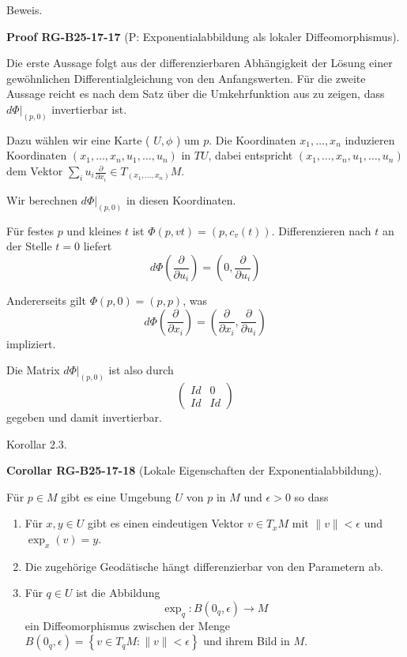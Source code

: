 \documentclass[10pt, letterpaper]{article}
\newcommand{\CustomHeading}[3]{%
  \par\medskip\noindent%
  \textbf{#1 #2} \textnormal{(#3)}.\enskip%
}
\newenvironment{KORO}[2]{\begin{unitbox}\CustomHeading{Corollar}{#1}{#2}}{\end{unitbox}}
\newenvironment{PROOF}[2]{\begin{unitbox}\CustomHeading{Proof}{#1}{#2}}{\end{unitbox}}
\begin{document}
Beweis. 

\begin{PROOF}{RG-B25-17-17}{P: Exponentialabbildung als lokaler Diffeomorphismus}
Die erste Aussage folgt aus der differenzierbaren Abhängigkeit der Lösung einer gewöhnlichen Differentialgleichung von den Anfangswerten. Für die zweite Aussage reicht es nach dem Satz über die Umkehrfunktion aus zu zeigen, dass $\left.d \Phi\right|_{(p, 0)}$ invertierbar ist.

Dazu wählen wir eine Karte ( $U, \phi$ ) um $p$. Die Koordinaten $x_{1}, \ldots, x_{n}$ induzieren Koordinaten $\left(x_{1}, \ldots, x_{n}, u_{1}, \ldots, u_{n}\right)$ in $T U$, dabei entspricht $\left(x_{1}, \ldots, x_{n}, u_{1}, \ldots, u_{n}\right)$ dem Vektor $\sum_{i} u_{i} \frac{\partial}{\partial x_{i}} \in T_{\left(x_{1}, \ldots, x_{n}\right)} M$.

Wir berechnen $\left.d \Phi\right|_{(p, 0)}$ in diesen Koordinaten.

Für festes $p$ und kleines $t$ ist $\Phi(p, v t)=\left(p, c_{v}(t)\right)$. Differenzieren nach $t$ an der Stelle $t=0$ liefert 
$$d \Phi\left(\frac{\partial}{\partial u_{i}}\right)=\left(0, \frac{\partial}{\partial u_{i}}\right)$$

Andererseits gilt $\Phi(p, 0)=(p, p)$, was 
$$d \Phi\left(\frac{\partial}{\partial x_{i}}\right)=\left(\frac{\partial}{\partial x_{i}}, \frac{\partial}{\partial u_{i}}\right)$$ 
impliziert.

Die Matrix $\left.d \Phi\right|_{(p, 0)}$ ist also durch 
$$\left(\begin{array}{cc}I d & 0 \\ I d & I d\end{array}\right)$$ 
gegeben und damit invertierbar.
\end{PROOF}




Korollar 2.3. 

\begin{KORO}{RG-B25-17-18}{Lokale Eigenschaften der Exponentialabbildung}
Für $p \in M$ gibt es eine Umgebung $U$ von $p$ in $M$ und $\epsilon>0$ so dass
\begin{enumerate}
  \item Für $x, y \in U$ gibt es einen eindeutigen Vektor $v \in T_{x} M$ mit $\|v\| < \epsilon$ und $\exp_{x}(v) = y$.
  
  \item Die zugehörige Geodätische hängt differenzierbar von den Parametern ab.

  \item Für $q \in U$ ist die Abbildung
  \[
  \exp_{q} : B\left(0_{q}, \epsilon\right) \rightarrow M
  \]
  ein Diffeomorphismus zwischen der Menge $B\left(0_{q}, \epsilon\right) = \left\{ v \in T_{q} M : \|v\| < \epsilon \right\}$ und ihrem Bild in $M$.
\end{enumerate}
\end{KORO}
\end{document}
